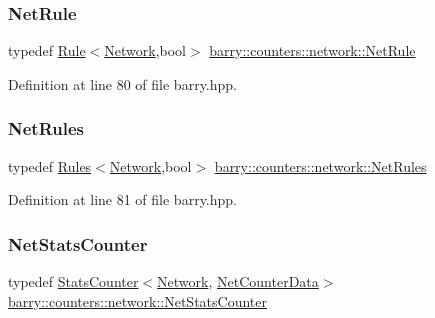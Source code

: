 \subsubsection{\texorpdfstring{Net\+Rule}{NetRule}}
{\footnotesize\ttfamily typedef \hyperlink{classbarry_1_1_rule}{Rule}$<$\hyperlink{namespacebarry_1_1counters_1_1network_a440182967e1ba465e90a4b1d07e3a366}{Network},bool$>$ \hyperlink{namespacebarry_1_1counters_1_1network_afbd2c2a61931e69dd5f668c421e87a6f}{barry\+::counters\+::network\+::\+Net\+Rule}}



Definition at line 80 of file barry.\+hpp.

\mbox{\label{namespacebarry_1_1counters_1_1network_adbdb20b3ce883777da2364984ea10c56}} 
\subsubsection{\texorpdfstring{Net\+Rules}{NetRules}}
{\footnotesize\ttfamily typedef \hyperlink{classbarry_1_1_rules}{Rules}$<$\hyperlink{namespacebarry_1_1counters_1_1network_a440182967e1ba465e90a4b1d07e3a366}{Network},bool$>$ \hyperlink{namespacebarry_1_1counters_1_1network_adbdb20b3ce883777da2364984ea10c56}{barry\+::counters\+::network\+::\+Net\+Rules}}



Definition at line 81 of file barry.\+hpp.

\mbox{\label{namespacebarry_1_1counters_1_1network_ae26c399917113fe280b3f2859376b8b9}} 
\subsubsection{\texorpdfstring{Net\+Stats\+Counter}{NetStatsCounter}}
{\footnotesize\ttfamily typedef \hyperlink{classbarry_1_1_stats_counter}{Stats\+Counter}$<$\hyperlink{namespacebarry_1_1counters_1_1network_a440182967e1ba465e90a4b1d07e3a366}{Network}, \hyperlink{classbarry_1_1counters_1_1network_1_1_net_counter_data}{Net\+Counter\+Data}$>$ \hyperlink{namespacebarry_1_1counters_1_1network_ae26c399917113fe280b3f2859376b8b9}{barry\+::counters\+::network\+::\+Net\+Stats\+Counter}}



